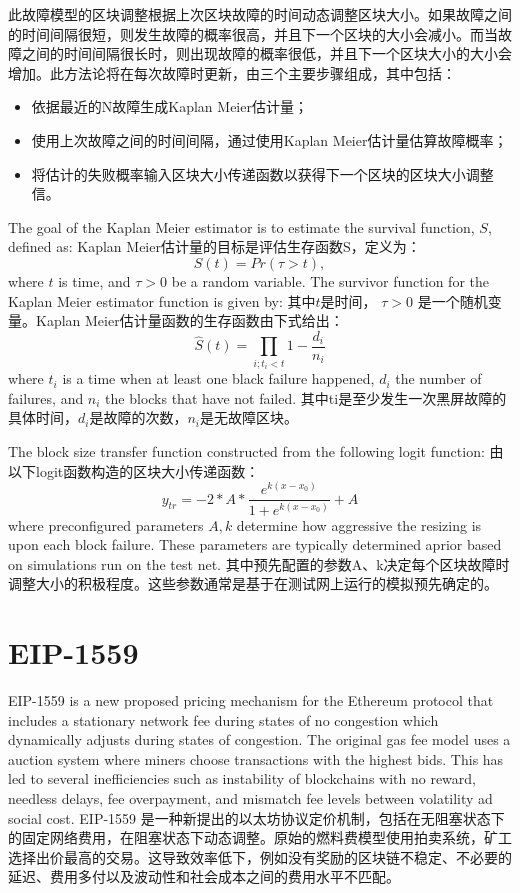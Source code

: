 \documentclass{ctexart}
\begin{document}
此故障模型的区块调整根据上次区块故障的时间动态调整区块大小。如果故障之间的时间间隔很短，则发生故障的概率很高，并且下一个区块的大小会减小。而当故障之间的时间间隔很长时，则出现故障的概率很低，并且下一个区块大小的大小会增加。此方法论将在每次故障时更新，由三个主要步骤组成，其中包括：

\begin{itemize}
\item 依据最近的N故障生成Kaplan Meier估计量；
\item 使用上次故障之间的时间间隔，通过使用Kaplan Meier估计量估算故障概率；
\item 将估计的失败概率输入区块大小传递函数以获得下一个区块的区块大小调整信。
\end{itemize}

The goal of the Kaplan Meier estimator is to estimate the survival function, $S$, defined as:
Kaplan Meier估计量的目标是评估生存函数S，定义为：
\begin{equation}
S(t) = Pr(\tau > t),
\end{equation}
where $t$ is time, and  $\tau > 0$ be a random variable. The survivor function for the Kaplan Meier estimator function is given by:
其中$t$是时间， $\tau > 0$ 是一个随机变量。Kaplan Meier估计量函数的生存函数由下式给出：
\begin{equation}
\hat{S}(t) = \prod_{i; t_{i} < t} 1- \frac{d_{i}}{n_{i}}
\end{equation}
where $t_{i}$ is a time when at least one black failure happened, $d_{i}$ the number of failures, and $n_{i}$ the blocks that have not failed. 其中ti是至少发生一次黑屏故障的具体时间，$d_{i}$是故障的次数，$n_{i}$是无故障区块。 

The block size transfer function constructed from the following logit function:
由以下logit函数构造的区块大小传递函数：
\begin{equation}
y_{tr} = -2*A*\frac{e^{k(x-x_{0})}}{1+e^{k(x-x_{0})}} + A
\end{equation}
where preconfigured parameters ${A,k}$  determine how aggressive the resizing is upon each block failure. These parameters are typically determined aprior based on simulations run on the test net. 其中预先配置的参数A、k决定每个区块故障时调整大小的积极程度。这些参数通常是基于在测试网上运行的模拟预先确定的。

\section{EIP-1559}

EIP-1559 is a new proposed pricing mechanism for the Ethereum protocol that includes a stationary network fee during states of no congestion which dynamically adjusts during states of congestion. The original gas fee model uses a auction system where miners choose transactions with the highest bids. This has led to several inefficiencies such as instability of blockchains with no reward, needless delays, fee overpayment, and mismatch fee levels between volatility ad social cost. EIP-1559 是一种新提出的以太坊协议定价机制，包括在无阻塞状态下的固定网络费用，在阻塞状态下动态调整。原始的燃料费模型使用拍卖系统，矿工选择出价最高的交易。这导致效率低下，例如没有奖励的区块链不稳定、不必要的延迟、费用多付以及波动性和社会成本之间的费用水平不匹配。
\end{document}

